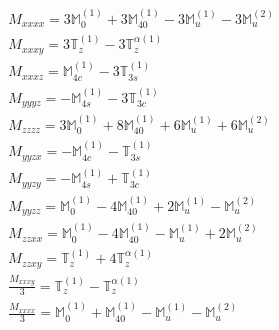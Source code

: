 \documentclass[fleqn,8pt,landscape]{jsarticle}
\begin{document}
\begin{align*}
& M_{xxxx} = 3 \mathbb{M}_{0}^{(1)} + 3 \mathbb{M}_{40}^{(1)} - 3 \mathbb{M}_{u}^{(1)} - 3 \mathbb{M}_{u}^{(2)} \\
& M_{xxxy} = 3 \mathbb{T}_{z}^{(1)} - 3 \mathbb{T}_{z}^{\alpha(1)} \\
& M_{xxxz} = \mathbb{M}_{4c}^{(1)} - 3 \mathbb{T}_{3s}^{(1)} \\
& M_{yyyz} = - \mathbb{M}_{4s}^{(1)} - 3 \mathbb{T}_{3c}^{(1)} \\
& M_{zzzz} = 3 \mathbb{M}_{0}^{(1)} + 8 \mathbb{M}_{40}^{(1)} + 6 \mathbb{M}_{u}^{(1)} + 6 \mathbb{M}_{u}^{(2)} \\
& M_{yyzx} = - \mathbb{M}_{4c}^{(1)} - \mathbb{T}_{3s}^{(1)} \\
& M_{yyzy} = - \mathbb{M}_{4s}^{(1)} + \mathbb{T}_{3c}^{(1)} \\
& M_{yyzz} = \mathbb{M}_{0}^{(1)} - 4 \mathbb{M}_{40}^{(1)} + 2 \mathbb{M}_{u}^{(1)} - \mathbb{M}_{u}^{(2)} \\
& M_{zzxx} = \mathbb{M}_{0}^{(1)} - 4 \mathbb{M}_{40}^{(1)} - \mathbb{M}_{u}^{(1)} + 2 \mathbb{M}_{u}^{(2)} \\
& M_{zzxy} = \mathbb{T}_{z}^{(1)} + 4 \mathbb{T}_{z}^{\alpha(1)} \\
& \frac{M_{xxxy}}{3} = \mathbb{T}_{z}^{(1)} - \mathbb{T}_{z}^{\alpha(1)} \\
& \frac{M_{xxxx}}{3} = \mathbb{M}_{0}^{(1)} + \mathbb{M}_{40}^{(1)} - \mathbb{M}_{u}^{(1)} - \mathbb{M}_{u}^{(2)}
\end{align*}
\end{document}
